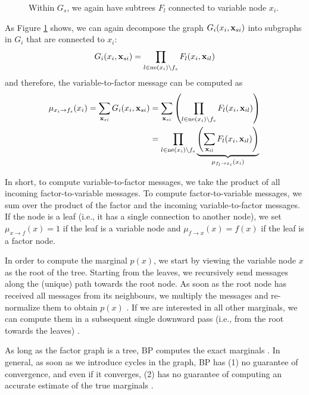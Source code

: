 \begin{figure}[ht]
    \centering
    \scalebox{1.25}{
        
    }
    \caption{Within $G_s$, we again have subtrees $F_l$ connected to variable node $x_i$.}
    \label{fig:gi}
\end{figure}

As Figure \ref{fig:gi} shows, we can again decompose the graph $G_i(x_i, \mathbf{x}_{si})$ into subgraphs in $G_i$ that are connected to $x_i$:
\begin{align}
    G_i(x_i, \mathbf{x}_{si}) = \prod_{l \in \operatorname{ne}(x_i) \setminus f_s} F_l(x_i, \mathbf{x}_{il})
\end{align}
and therefore, the variable-to-factor message can be computed as
\begin{align}
    \mu_{x_i \to f_s}(x_i) = \sum_{\mathbf{x}_{si}} G_i(x_i, \mathbf{x}_{si}) &= \sum_{\mathbf{x}_{si}} \left( \prod_{l \in \operatorname{ne}(x_i) \setminus f_s} F_l(x_i, \mathbf{x}_{il}) \right) \\ 
    &= \prod_{l \in \operatorname{ne}(x_i) \setminus f_s} \underbrace{\left( \sum_{\mathbf{x}_{il}} F_l(x_i, \mathbf{x}_{il}) \right)}_{\mu_{f_l \to x_i}(x_i)}
\end{align}

In short, to compute variable-to-factor messages, we take the product of all incoming factor-to-variable messages. To compute factor-to-variable messages, we sum over the product of the factor and the incoming variable-to-factor messages.
If the node is a leaf (i.e., it has a single connection to another node), we set $\mu_{x \to f}(x) = 1$ if the leaf is a variable node and $\mu_{f \to x}(x) = f(x)$ if the leaf is a factor node.

In order to compute the marginal $p(x)$, we start by viewing the variable node $x$ as the root of the tree. Starting from the leaves, we recursively send messages along the (unique) path towards the root node. As soon as the root node has received all messages from its neighbours, we multiply the messages and re-normalize them to obtain $p(x)$ \cite{bishop}. If we are interested in all other marginals, we can compute them in a subsequent single downward pass (i.e., from the root towards the leaves) \cite{bishop}.

As long as the factor graph is a tree, BP computes the exact marginals \cite{bp}. In general, as soon as we introduce cycles in the graph, BP has (1) no guarantee of convergence, and even if it converges, (2) has no guarantee of computing an accurate estimate of the true marginals \cite{bp}.

